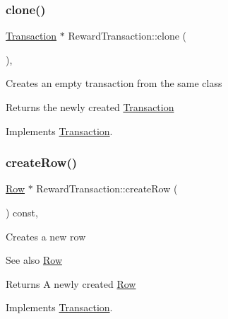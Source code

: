 \subsubsection{\texorpdfstring{clone()}{clone()}}
{\footnotesize\ttfamily \mbox{\hyperlink{classTransaction}{Transaction}} $\ast$ Reward\+Transaction\+::clone (\begin{DoxyParamCaption}{ }\end{DoxyParamCaption})\hspace{0.3cm}{\ttfamily [override]}, {\ttfamily [virtual]}}

Creates an empty transaction from the same class

\begin{DoxyReturn}{Returns}
the newly created \mbox{\hyperlink{classTransaction}{Transaction}} 
\end{DoxyReturn}


Implements \mbox{\hyperlink{classTransaction_ad6ee9c5e4067b2f5c950c6aad131b3e4}{Transaction}}.

\mbox{\label{classRewardTransaction_ad43c1d706406f40d43f433b0d0b0b510}} 
\subsubsection{\texorpdfstring{create\+Row()}{createRow()}}
{\footnotesize\ttfamily \mbox{\hyperlink{classRow}{Row}} $\ast$ Reward\+Transaction\+::create\+Row (\begin{DoxyParamCaption}{ }\end{DoxyParamCaption}) const\hspace{0.3cm}{\ttfamily [override]}, {\ttfamily [virtual]}}

Creates a new row \begin{DoxySeeAlso}{See also}
\mbox{\hyperlink{classRow}{Row}}
\end{DoxySeeAlso}
\begin{DoxyReturn}{Returns}
A newly created \mbox{\hyperlink{classRow}{Row}} 
\end{DoxyReturn}


Implements \mbox{\hyperlink{classTransaction_aa80b621537fe480dcb4444bba703abe5}{Transaction}}.

\mbox{\label{classReward_a95e98fc9dbbc9da47cee243adc1932d2}} 
